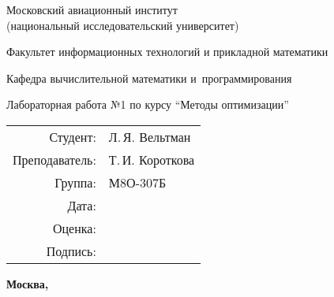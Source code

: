 \begin{titlepage}
\begin{center}
\bfseries

{\Large Московский авиационный институт\\ (национальный исследовательский университет)

}

\vspace{48pt}

{\large Факультет информационных технологий и прикладной математики
}

\vspace{36pt}


{\large Кафедра вычислительной математики и~программирования

}


\vspace{48pt}

Лабораторная работа №1 по курсу \enquote{Методы оптимизации} \\


\end{center}

\vspace{72pt}

\begin{flushright}
\begin{tabular}{rl}
Студент: & Л.\,Я. Вельтман \\
Преподаватель: & Т.\,И. Короткова \\
Группа: & М8О-307Б \\
Дата: & \\
Оценка: & \\
Подпись: & \\
\end{tabular}
\end{flushright}

\vfill

\begin{center}
\bfseries
Москва, \the\year
\end{center}
\end{titlepage}

\pagebreak